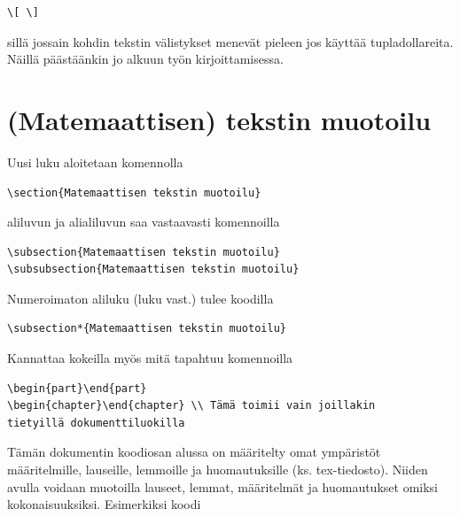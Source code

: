 \documentclass[a4paper,12 pt]{article}
\theoremstyle{plain}
\theoremstyle{definition}
\theoremstyle{remark}
\numberwithin{equation}{section}
\numberwithin{figure}{section}
\begin{document}
\begin{verbatim}
\[ \]
\end{verbatim}
sillä jossain kohdin tekstin välistykset menevät pieleen jos käyttää tupladollareita. Näillä päästäänkin jo alkuun työn kirjoittamisessa.

\newpage
\section{(Matemaattisen) tekstin muotoilu}
Uusi luku aloitetaan komennolla

\begin{verbatim}
\section{Matemaattisen tekstin muotoilu}
\end{verbatim}
aliluvun ja alialiluvun saa vastaavasti komennoilla

\begin{verbatim}
\subsection{Matemaattisen tekstin muotoilu}
\subsubsection{Matemaattisen tekstin muotoilu}
\end{verbatim}
Numeroimaton aliluku (luku vast.) tulee koodilla

\begin{verbatim}
\subsection*{Matemaattisen tekstin muotoilu}
\end{verbatim}
Kannattaa kokeilla myös mitä tapahtuu komennoilla 

\begin{verbatim}
\begin{part}\end{part}
\begin{chapter}\end{chapter} \\ Tämä toimii vain joillakin 
tietyillä dokumenttiluokilla
\end{verbatim}

Tämän dokumentin koodiosan alussa on määritelty omat ympäristöt määritel\-mille, lauseille, lemmoille ja huomautuksille (ks. tex-tiedosto). Niiden avulla voidaan muotoilla lauseet, lemmat, määritelmät ja huomautukset omiksi kokonaisuuksiksi. Esimerkiksi koodi
\end{document}
